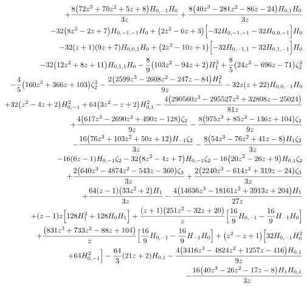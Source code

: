 \begin{eqnarray}
\nonumber \\ &&
+\frac{8 \big(72 z^3+70  z^2+5 z+8\big) H_{0,-1} H_0}{3 z}
+\frac{8 \big(40 z^3-281 z^2-86 z-24\big)  H_{0,1} H_0}{3 z}
\nonumber \\ &&
-32  \big(8 z^2-2 z+7\big) H_{0,-1,-1} H_0
+\big(2z^2-6 z+3\big) \Bigl[-32 H_{0,-1,-1}-32 H_{0,0,-1}\Bigr] H_0
\nonumber \\ &&
-32 (z+1) (9 z+7) H_{0,0,1} H_0+\big(2 z^2-10 z+1\big) \Bigl[-32H_{0,-1,1}-32 H_{0,1,-1}\Bigr] H_0
\nonumber \\ &&
-32 \big(12 z^2+8 z+11\big) H_{0,1,1}H_0-\frac{8}{9} \big(103 z^2-94 z+2\big) H_1^3+\frac{8}{5} \big(24 z^2-696z-71\big) \zeta_2^2
\nonumber \\ &&
-\frac{4}{5}  \big(160 z^2+366 z+103\big)\zeta_2^2-\frac{2 \big(2599 z^3-2608 z^2-247 z-84\big) H_1^2}{9 z}
-32  z (z+22)H_{0,0,-1} H_0
\nonumber \\ &&
+32 \big(z^2-4 z+2\big) H_{0,-1}^2+64 \big(3 z^2-z+2\big) H_{0,1}^2-\frac{4  \big(290560 z^3-295527 z^2+32808 z-25024\big)}{81 z}
\nonumber \\ &&
+\frac{4 \big(617  z^3-2690 z^2+490 z-128\big) \zeta_2}{9 z}-\frac{8  \big(975  z^3+85 z^2-136 z+104\big) \zeta_2}{9 z}
\nonumber \\ &&
-\frac{16  \big(76 z^3+103  z^2+50 z+12\big) H_{-1} \zeta_2}{3 z}-\frac{8 \big(54 z^3-76 z^2+41  z-8\big) H_1 \zeta_2}{3 z}
\nonumber \\ &&
-16  (6 z-1) H_{0,-1} \zeta_2-32\big(8 z^2-4 z+7\big) H_{0,-1} \zeta_2-16 \big(20 z^2-26 z+9\big) H_{0,1}\zeta_2
\nonumber \\ &&
+\frac{2 \big(640 z^3-4874 z^2-543 z-360\big) \zeta_3}{3  z}+\frac{2  \big(2240 z^3-614 z^2+319 z-24\big) \zeta_3}{3  z}
\nonumber \\ &&
+\frac{64  (z-1) \big(33 z^2+2\big) H_1}{3 z}-\frac{4 \big(14636  z^3-18161 z^2+3913 z+204\big) H_1}{27 z}
\nonumber \\ &&
+(z-1) z \Bigl[128  H_1^2+128 H_0 H_1\Bigr]+\frac{(z+1) \big(251 z^2-32 z+20\big)}{z} \Bigl[\frac{16}{9}  H_{0,-1}-\frac{16}{9} H_{-1} H_0\Bigr]
\nonumber \\ &&
+\frac{\big(831 z^3+733 z^2-88  z+104\big)}{z} \Bigl[\frac{16}{9}  H_{0,-1}-\frac{16}{9}  H_{-1}  H_0\Bigr]+\big(z^2-z+1\big) \Bigl[32 H_{0,-1} H_0^2
\nonumber \\ &&
+64H_{0,-1}^2\Bigr]-\frac{64}{3}  (21 z+2) H_{0,1}-\frac{4 \big(3416  z^3-4824 z^2+1257 z-416\big) H_{0,1}}{9 z}
\nonumber \\ &&
-\frac{16 \big(40 z^3-26 z^2-17  z-8\big) H_1 H_{0,1}}{3 z}

\end{eqnarray}
